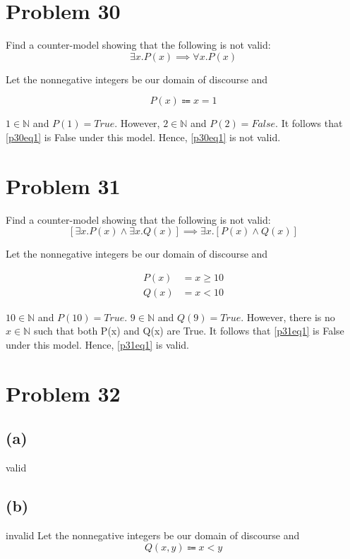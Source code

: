 \documentclass{article}
\begin{document}
\pagebreak

\section{Problem 30}
Find a counter-model showing that the following is not valid:
\begin{equation}\label{p30eq1}
	\exists x.P(x) \implies \forall x.P(x)
\end{equation}

Let the nonnegative integers be our domain of discourse and

\[
	P(x) \Coloneqq x = 1
\]

$1 \in \mathbb{N}$ and $P(1) = True$. However, $2 \in \mathbb{N}$ and $P(2) = False$. It follows that \eqref{p30eq1} is False under this model. Hence, \eqref{p30eq1} is not valid.

\pagebreak

\section{Problem 31}
Find a counter-model showing that the following is not valid:
\begin{equation}\label{p31eq1}
	[\exists x.P(x) \land \exists x.Q(x)] \implies \exists x.[P(x) \land Q(x)]
\end{equation}

Let the nonnegative integers be our domain of discourse and

\begin{align*}
	P(x) & = x \ge 10 \\
	Q(x) & = x < 10
\end{align*}

$10 \in \mathbb{N}$ and $P(10) = True$. $9 \in \mathbb{N}$ and $Q(9) = True$. However, there is no $x \in \mathbb{N}$ such that both P(x) and Q(x) are True. It follows that \eqref{p31eq1} is False under this model. Hence, \eqref{p31eq1} is valid.

\pagebreak

\section{Problem 32}
\subsection{(a)}
valid

\subsection{(b)}
invalid
Let the nonnegative integers be our domain of discourse and
\[
	Q(x,y) \Coloneqq x < y
\]
\end{document}
